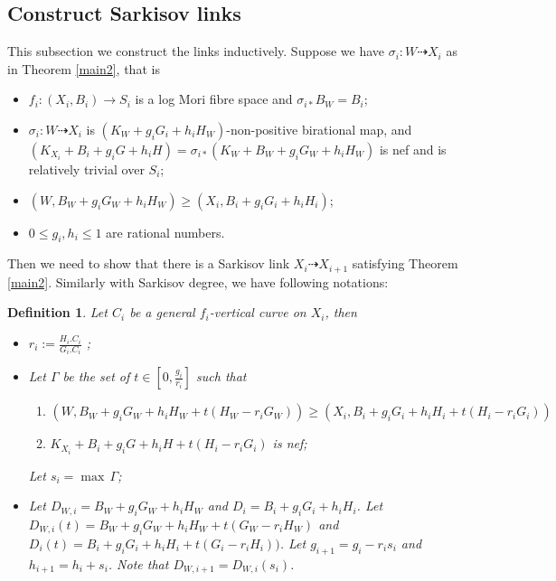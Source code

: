 \documentclass{article}
\newtheorem{defn}{Definition}[subsection]
\begin{document}
\subsection{Construct Sarkisov links}
This subsection we construct the links inductively. Suppose we have $\sigma_{i}:W\dashrightarrow X_{i}$ as in Theorem  \ref{main2}, that is 
\begin{itemize}
  \item $f_{i}:(X_{i},B_{i})\to S_{i}$ is a log Mori fibre space and $\sigma_{i*} B_{W}=B_{i}$;
  \item $\sigma_{i}:W\dashrightarrow  X_{i}$ is $(K_{W}+g_{i}G_{i}+h_{i}H_{W})$-non-positive birational map, and $(K_{X_{i}}+B_{i}+g_{i}G+h_{i}H)=\sigma_{i*}(K_{W}+B_{W}+g_{i}G_{W}+h_{i}H_{W})$ is nef and is relatively trivial over $S_{i}$;
  \item $(W,B_{W}+g_{i}G_{W}+h_{i}H_{W})\geqslant (X_{i},B_{i}+g_{i}G_{i}+h_{i}H_{i})$;
  \item $0\leqslant g_{i},h_{i}\leqslant 1$ are  rational numbers.
\end{itemize}
Then we need to show that there is a Sarkisov link $X_{i}\dashrightarrow X_{i+1}$ satisfying  Theorem \ref{main2}. Similarly with Sarkisov degree, we have following notations:
\begin{defn}
  Let $C_{i}$ be a general $f_{i}$-vertical curve on $X_{i}$, then
  \begin{itemize}
    \item $r_{i}:=\frac{H_{i}.C_{i}}{G_{i}.C_{i}}$ ;
    \item Let $\Gamma$ be the set of $t\in [0,\frac{g_{i}}{r_{i}}] $ such that 
      \begin{enumerate}
        \item\label{singularcondition} $\left(W,B_{W}+g_{i}G_{W}+h_{i}H_{W}+t(H_{W}-r_{i}G_{W})\right)\geqslant \left(X_{i},B_{i}+g_{i}G_{i}+h_{i}H_{i}+t\left(H_{i}-r_{i}G_{i}\right)\right)$
        \item$K_{X_{i}}+B_{i}+g_{i}G+h_{i}H+t(H_{i}-r_{i}G_{i})$ is nef;
    \end{enumerate}
    Let $s_{i}=\max\, \Gamma $;
\item Let $D_{W,i}=B_{W}+g_{i}G_{W}+h_{i}H_{W}$ and $D_{i}=B_{i}+g_{i}G_{i}+h_{i}H_{i}$. Let $D_{W,i}(t)=B_{W}+g_{i}G_{W}+h_{i}H_{W}+t(G_{W}-r_{i}H_{W})$ and $D_{i}(t)=B_{i}+g_{i}G_{i}+h_{i}H_{i}+t\left(G_{i}-r_{i}H_{i}\right))$. Let $g_{i+1}=g_{i}-r_{i}s_{i}$ and $h_{i+1}=h_{i}+s_{i}$. Note that $D_{W,i+1}=D_{W,i}(s_{i})$. 
  \end{itemize}
\end{defn}
\end{document}
